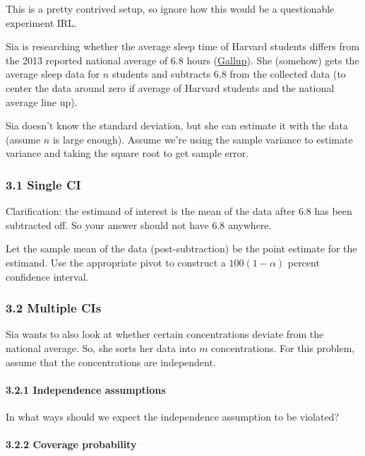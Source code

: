 \documentclass[
]{article}
\begin{document}
This is a pretty contrived setup, so ignore how this would be a
questionable experiment IRL.

Sia is researching whether the average sleep time of Harvard students
differs from the 2013 reported national average of 6.8 hours
(\href{https://news.gallup.com/poll/166553/less-recommended-amount-sleep.aspx}{Gallup}).
She (somehow) gets the average sleep data for \(n\) students and
subtracts \(6.8\) from the collected data (to center the data around
zero if average of Harvard students and the national average line up).

Sia doesn't know the standard deviation, but she can estimate it with
the data (assume \(n\) is large enough). Assume we're using the sample
variance to estimate variance and taking the square root to get sample
error.

\hypertarget{single-ci}{%
\subsubsection{3.1 Single CI}\label{single-ci}}

Clarification: the estimand of interest is the mean of the data after
6.8 has been subtracted off. So your answer should not have 6.8
anywhere.

Let the sample mean of the data (post-subtraction) be the point estimate
for the estimand. Use the appropriate pivot to construct a
\(100(1 - \alpha)\) percent confidence interval.

\hypertarget{multiple-cis}{%
\subsubsection{3.2 Multiple CIs}\label{multiple-cis}}

Sia wants to also look at whether certain concentrations deviate from
the national average. So, she sorts her data into \(m\) concentrations.
For this problem, assume that the concentrations are independent.

\hypertarget{independence-assumptions}{%
\paragraph{3.2.1 Independence
assumptions}\label{independence-assumptions}}

In what ways should we expect the independence assumption to be
violated?

\hypertarget{coverage-probability}{%
\paragraph{3.2.2 Coverage probability}\label{coverage-probability}}
\end{document}
